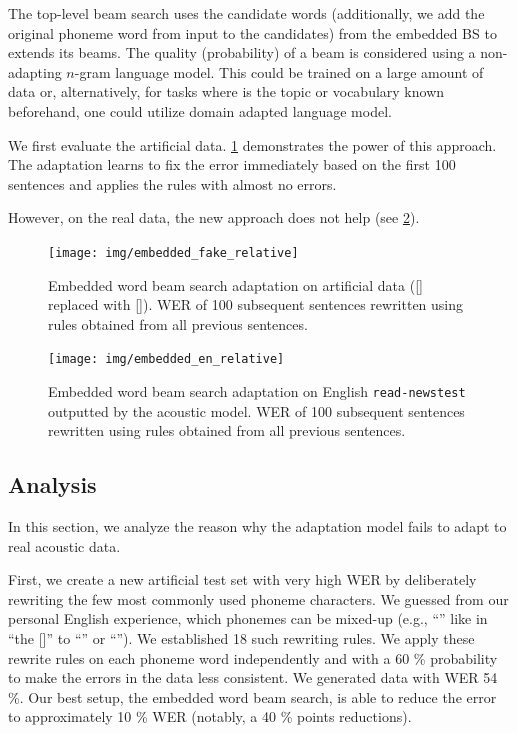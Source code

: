 The top-level beam search uses the candidate words (additionally, we add the original phoneme word from input to the candidates) from the embedded BS to extends its beams. The quality (probability) of a beam is considered using a non-adapting $n$-gram language model. This could be trained on a large amount of data or, alternatively, for tasks where is the topic or vocabulary known beforehand, one could utilize domain adapted language model. 

We first evaluate the artificial data. \cref{fig:embedded} demonstrates the power of this approach. The adaptation learns to fix the error immediately based on the first 100 sentences and applies the rules with almost no errors.

However, on the real data, the new approach does not help (see \cref{fig:embedded_en}). 

\begin{figure}[h]
    \texttt{[image: img/embedded\_fake\_relative]}
    \caption{Embedded word beam search  adaptation on artificial data ([] replaced with []). WER of 100 subsequent sentences rewritten using rules obtained from all previous sentences.}
    \label{fig:embedded} 
\end{figure}

\begin{figure}[h]
    \texttt{[image: img/embedded\_en\_relative]}
    \caption{Embedded word beam search adaptation on English \texttt{read-newstest} outputted by the acoustic model. WER of 100 subsequent sentences rewritten using rules obtained from all previous sentences.}
    \label{fig:embedded_en} 
\end{figure}


\subsection{Analysis}
In this section, we analyze the reason why the adaptation model fails to adapt to real acoustic data.

First, we create a new artificial test set with very high WER by deliberately rewriting the few most commonly used phoneme characters. We guessed from our personal English experience, which phonemes can be mixed-up (e.g., ``'' like in ``the []'' to ``'' or ``''). We established 18 such rewriting rules. We apply these rewrite rules on each phoneme word independently and with a 60 \% probability to make the errors in the data less consistent. We generated data with WER 54 \%. Our best setup, the embedded word beam search, is able to reduce the error to approximately 10 \% WER (notably, a 40 \% points reductions).  

